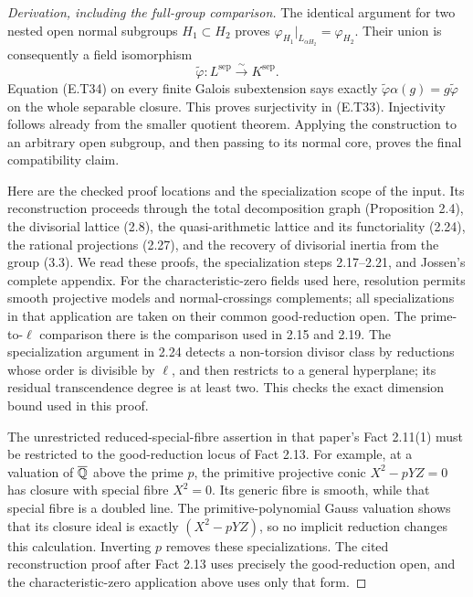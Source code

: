 \begin{proof}[Derivation, including the full-group comparison]
The identical argument for two nested open normal subgroups
$H_1\subset H_2$ proves
$\varphi_{H_1}|_{L_{\alpha H_2}}=\varphi_{H_2}$.
Their union is consequently a field isomorphism
\[
 \widetilde\varphi:L^{\mathrm{sep}}\xrightarrow{\sim}K^{\mathrm{sep}}.
\]
Equation (E.T34) on every finite Galois subextension says exactly
$\widetilde\varphi\alpha(g)=g\widetilde\varphi$ on the whole
separable closure.  This proves surjectivity in (E.T33).
Injectivity follows already from the smaller quotient theorem.
Applying the construction to an arbitrary open subgroup, and then
passing to its normal core, proves the final compatibility claim.

Here are the checked proof locations and the specialization scope
of the input.  Its reconstruction proceeds through the total
decomposition graph (Proposition 2.4), the divisorial lattice
(2.8), the quasi-arithmetic lattice and its functoriality (2.24),
the rational projections (2.27), and the recovery of divisorial
inertia from the group (3.3).  We read these proofs, the
specialization steps 2.17--2.21, and Jossen's complete appendix.
For the characteristic-zero fields used here, resolution permits
smooth projective models and normal-crossings complements; all
specializations in that application are taken on their common
good-reduction open.  The prime-to-$\ell$ comparison there is the
comparison used in 2.15 and 2.19.  The specialization argument
in 2.24 detects a non-torsion divisor class by reductions whose
order is divisible by $\ell$, and then restricts to a general
hyperplane; its residual transcendence degree is at least two.
This checks the exact dimension bound used in this proof.

The unrestricted reduced-special-fibre assertion in that paper's
Fact 2.11(1) must be restricted to the good-reduction locus of
Fact 2.13.  For example, at a valuation of $\overline{\mathbb Q}$ above
the prime $p$, the primitive projective conic
$X^2-pYZ=0$ has closure with special fibre $X^2=0$.
Its generic fibre is smooth, while that special fibre is a
doubled line.  The primitive-polynomial Gauss valuation shows
that its closure ideal is exactly $(X^2-pYZ)$, so no implicit
reduction changes this calculation.  Inverting $p$ removes
these specializations.  The cited reconstruction proof after
Fact 2.13 uses precisely the good-reduction open, and the
characteristic-zero application above uses only that form.
\end{proof}


